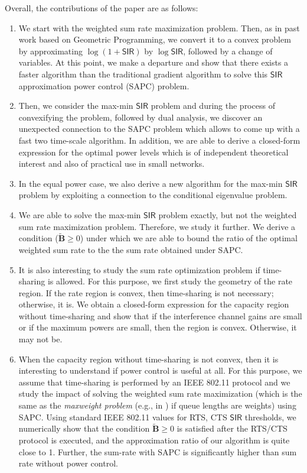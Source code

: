\documentclass[10pt,twocolumn]{IEEEtran}
\newcommand{\0}{\mathbf{0}}
\newcommand{\1}{\mathbf{1}}
\begin{document}
Overall, the contributions of the paper are as follows:
\begin{enumerate}
\item We start with the weighted sum rate maximization problem. Then, as 
in past work based on Geometric Programming, we convert it to a convex problem by 
approximating $\log(1+\mathsf{SIR})$ by $\log \mathsf{SIR}$, followed by a change of variables. At this point, we make a departure 
and show that there exists a faster algorithm than the traditional 
gradient algorithm to solve this $\mathsf{SIR}$ approximation power control (SAPC) problem.

\item Then, we consider the max-min $\mathsf{SIR}$ problem and during the process of 
convexifying the problem, followed by dual analysis, we discover an 
unexpected connection to the SAPC problem which allows to come up with a 
fast two time-scale algorithm. In addition, we are able to derive a 
closed-form expression for the optimal power levels which is of 
independent theoretical interest and also of practical use in small 
networks.

\item In the equal power case, we also derive a new algorithm for the 
max-min $\mathsf{SIR}$ problem by exploiting a connection to the conditional 
eigenvalue problem.

\item We are able to solve the max-min $\mathsf{SIR}$ problem exactly, but not the 
weighted sum rate maximization problem. Therefore, we study it further. We derive 
a condition ($\mathbf{\tilde{B}} \ge 0$) under which we are able to bound the ratio of 
the optimal weighted sum rate to the the sum rate obtained under SAPC.

\item It is also interesting to study the sum rate optimization problem if 
time-sharing is allowed. For this purpose, we first study the geometry 
of the rate region. If the rate region is convex, then time-sharing is 
not necessary; otherwise, it is. We obtain a closed-form expression for 
the capacity region without time-sharing and show that if the 
interference channel gains are small or if the maximum powers are small, 
then the region is convex. Otherwise, it may not be.

\item When the capacity region without time-sharing is not convex, then 
it is interesting to understand if power control is useful at all. For 
this purpose, we assume that time-sharing is performed by an IEEE 802.11 
protocol and we study the impact of solving the weighted sum rate 
maximization (which is the same as the {\it maxweight problem} (e.g., in \cite{LinShroff06,Eryilmaz06}) if queue 
lengths are weights) using SAPC. Using standard IEEE 802.11 values for RTS, 
CTS $\mathsf{SIR}$ thresholds, we numerically show that the condition $\mathbf{\tilde{B}} \ge 0$ is 
satisfied after the RTS/CTS protocol is executed, and the approximation 
ratio of our algorithm is quite close to 1. Further, the sum-rate with 
SAPC is significantly higher than sum rate without power control.
\end{enumerate}
\end{document}
